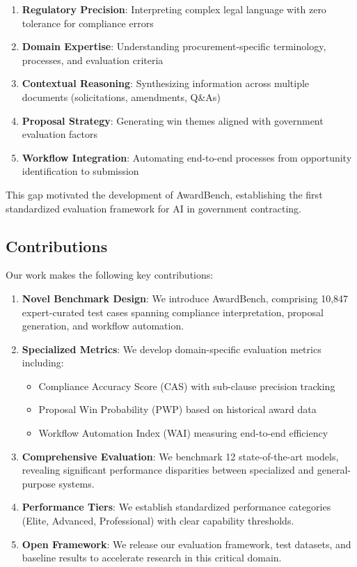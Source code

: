 \documentclass[11pt,a4paper]{article}
\begin{document}
\begin{enumerate}
    \item \textbf{Regulatory Precision}: Interpreting complex legal language with zero tolerance for compliance errors
    \item \textbf{Domain Expertise}: Understanding procurement-specific terminology, processes, and evaluation criteria
    \item \textbf{Contextual Reasoning}: Synthesizing information across multiple documents (solicitations, amendments, Q\&As)
    \item \textbf{Proposal Strategy}: Generating win themes aligned with government evaluation factors
    \item \textbf{Workflow Integration}: Automating end-to-end processes from opportunity identification to submission
\end{enumerate}

This gap motivated the development of AwardBench, establishing the first standardized evaluation framework for AI in government contracting.

\subsection{Contributions}

Our work makes the following key contributions:

\begin{enumerate}
    \item \textbf{Novel Benchmark Design}: We introduce AwardBench, comprising 10,847 expert-curated test cases spanning compliance interpretation, proposal generation, and workflow automation.
    
    \item \textbf{Specialized Metrics}: We develop domain-specific evaluation metrics including:
    \begin{itemize}
        \item Compliance Accuracy Score (CAS) with sub-clause precision tracking
        \item Proposal Win Probability (PWP) based on historical award data
        \item Workflow Automation Index (WAI) measuring end-to-end efficiency
    \end{itemize}
    
    \item \textbf{Comprehensive Evaluation}: We benchmark 12 state-of-the-art models, revealing significant performance disparities between specialized and general-purpose systems.
    
    \item \textbf{Performance Tiers}: We establish standardized performance categories (Elite, Advanced, Professional) with clear capability thresholds.
    
    \item \textbf{Open Framework}: We release our evaluation framework, test datasets, and baseline results to accelerate research in this critical domain.
\end{enumerate}
\end{document}
